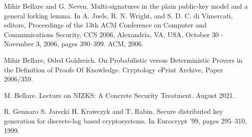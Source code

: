 \documentclass[psamsfonts, reqno]{amsart}
\theoremstyle{definition}
\theoremstyle{remark}
\numberwithin{equation}{section}
\begin{document}
\begin{thebibliography}{9}
Mihir Bellare and G. Neven. Multi-signatures in the plain public-key model
and a general forking lemma. In A. Juels, R. N. Wright, and S. D. C.
di Vimercati, editors, Proceedings of the 13th ACM Conference on Computer
and Communications Security, CCS 2006, Alexandria, VA, USA, October
30 - November 3, 2006, pages 390–399. ACM, 2006.

Mihir Bellare, Oded Goldreich.
On Probabilistic versus Deterministic Provers
in the Definition of Proofs Of Knowledge.
Cryptology ePrint Archive, Paper 2006/359.

M. Bellare.
Lecture on NIZKS: A Concrete Security Treatment.
August 2021.

R. Gennaro S. Jarecki H. Krawczyk and T. Rabin.
Secure distributed key generation for discrete-log based cryptosystems.
In Eurocrypt ’99, pages 295–310,
1999.

\end{thebibliography}
\end{document}
